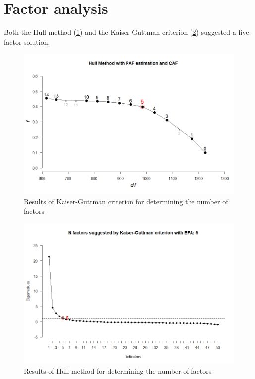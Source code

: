 \documentclass[
]{book}
\begin{document}
\hypertarget{factor-analysis}{%
\section{Factor analysis}\label{factor-analysis}}

Both the Hull method (\ref{fig:hull-figure}) and the Kaiser-Guttman
criterion (\ref{fig:kgc-figure}) suggested a five-factor solution.

\begin{figure}
\includegraphics[width=1\linewidth]{04_figures/hull-n-factors} \caption{Results of Kaiser-Guttman criterion for determining the number of factors}\label{fig:hull-figure}
\end{figure}

\begin{figure}
\includegraphics[width=1\linewidth]{04_figures/KGC-n-factors} \caption{Results of Hull method for determining the number of factors}\label{fig:kgc-figure}
\end{figure}
\end{document}
